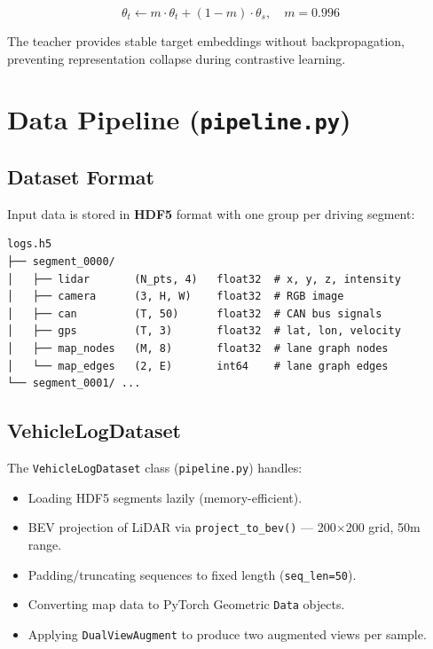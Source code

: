 \documentclass[12pt,a4paper]{article}
\begin{document}
\begin{equation}
    \theta_t \leftarrow m \cdot \theta_t + (1-m) \cdot \theta_s, \quad m = 0.996
\end{equation}

The teacher provides stable target embeddings without backpropagation, preventing
representation collapse during contrastive learning.

\section{Data Pipeline (\texttt{pipeline.py})}

\subsection{Dataset Format}

Input data is stored in \textbf{HDF5} format with one group per driving segment:

\begin{lstlisting}[style=pythonstyle, caption={HDF5 dataset structure}]
logs.h5
├── segment_0000/
│   ├── lidar       (N_pts, 4)   float32  # x, y, z, intensity
│   ├── camera      (3, H, W)    float32  # RGB image
│   ├── can         (T, 50)      float32  # CAN bus signals
│   ├── gps         (T, 3)       float32  # lat, lon, velocity
│   ├── map_nodes   (M, 8)       float32  # lane graph nodes
│   └── map_edges   (2, E)       int64    # lane graph edges
└── segment_0001/ ...
\end{lstlisting}

\subsection{VehicleLogDataset}

The \texttt{VehicleLogDataset} class (\texttt{pipeline.py}) handles:
\begin{itemize}[leftmargin=1.5em]
    \item Loading HDF5 segments lazily (memory-efficient).
    \item BEV projection of LiDAR via \texttt{project\_to\_bev()} — 200$\times$200 grid, 50m range.
    \item Padding/truncating sequences to fixed length (\texttt{seq\_len=50}).
    \item Converting map data to PyTorch Geometric \texttt{Data} objects.
    \item Applying \texttt{DualViewAugment} to produce two augmented views per sample.
\end{itemize}
\end{document}
